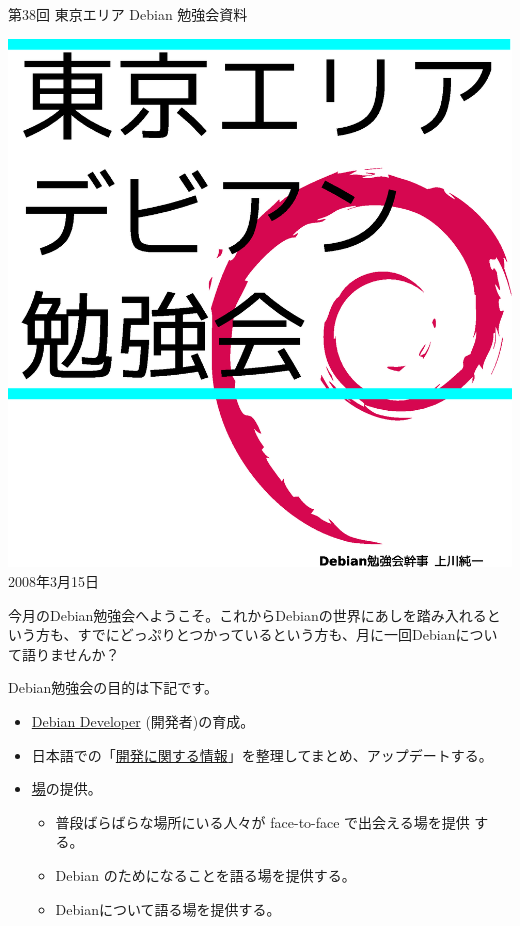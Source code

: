 \documentclass[mingoth,a4paper]{jsarticle}
\newcommand{\debmtgyear}{2008}
\newcommand{\debmtgmonth}{3}
\newcommand{\debmtgdate}{15}
\newcommand{\debmtgnumber}{38}
\begin{document}
\begin{titlepage}
\thispagestyle{empty}


\vspace*{-2cm}
第\debmtgnumber{}回 東京エリア Debian 勉強会資料

\hspace*{-2.4cm}
\includegraphics[width=210mm]{image200801/2008title.eps}\\
\hfill{}\debmtgyear{}年\debmtgmonth{}月\debmtgdate{}日

\end{titlepage}

 
 今月のDebian勉強会へようこそ。これからDebianの世界にあしを踏み入れると
 いう方も、すでにどっぷりとつかっているという方も、月に一回Debianについ
 て語りませんか？

 Debian勉強会の目的は下記です。

\begin{itemize}
 \item \underline{Debian Developer} (開発者)の育成。
 \item 日本語での「\underline{開発に関する情報}」を整理してまとめ、アップデートする。
 \item \underline{場}の提供。
 \begin{itemize}
  \item 普段ばらばらな場所にいる人々が face-to-face で出会える場を提供
	する。
  \item Debian のためになることを語る場を提供する。
  \item Debianについて語る場を提供する。
 \end{itemize}
\end{itemize}		
\end{document}
